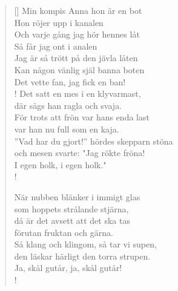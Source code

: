 \documentclass[11pt, a4paper]{article} %
\begin{document}
\begin{verse}[\versewidth]
Min kompis Anna hon är en bot \\
Hon röjer upp i kanalen \\
Och varje gång jag hör hennes låt \\
Så får jag ont i analen \\
Jag är så trött på den jävla låten \\
Kan någon vänlig själ banna boten \\
Det vette fan, jag fick en ban! \\!
\newpage
Det satt en mes i en klyvarmast, \\
där sågs han ragla och svaja. \\
För trots att frön var hans enda last \\
var han nu full som en kaja. \\
''Vad har du gjort!'' hördes skepparn stöna \\
och mesen svarte: "Jag rökte fröna! \\
I egen holk, i egen holk." \\!

När nubben blänker i immigt glas \\
som hoppets strålande stjärna, \\
då är det avsett att det ska tas \\
förutan fruktan och gärna. \\
Så klang och klingom, så tar vi supen, \\
den läskar härligt den torra strupen. \\
Ja, skål gutår, ja, skål gutår! \\!




\end{verse}

\end{document}
